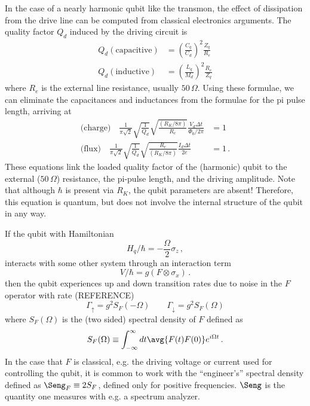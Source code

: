 In the case of a nearly harmonic qubit like the transmon, the effect of dissipation from the drive line can be computed from classical electronics arguments.
The quality factor $Q_d$ induced by the driving circuit is
\begin{align*}
  Q_d (\text{capacitive}) &= \left( \frac{C_q}{C_d} \right)^2 \frac{Z_q}{R_e} \\
  Q_d (\text{inductive}) &= \left( \frac{L_q}{M_d} \right)^2 \frac{R_e}{Z_q}
\end{align*}
where $R_e$ is the external line resistance, usually $50 \, \Omega$.
Using these formulae, we can eliminate the capacitances and inductances from the formulae for the pi pulse length, arriving at
\begin{align*}
  \text{(charge)} \quad
    \frac{1}{\pi\sqrt{2}} \sqrt{\frac{1}{Q_d}}
    \sqrt{\frac{(R_K/8\pi)}{R_e}} \frac{V_d \Delta t}{\Phi_0/2\pi} &= 1 \\
  \text{(flux)} \quad
    \frac{1}{\pi\sqrt{2}} \sqrt{\frac{1}{Q_d}}
    \sqrt{\frac{R_e}{(R_K/8\pi)}} \frac{I_d \Delta t}{2e} &= 1 \, .
\end{align*}
These equations link the loaded quality factor of the (harmonic) qubit to the external ($50 \, \Omega$) resistance, the pi-pulse length, and the driving amplitude.
Note that although $\hbar$ is present via $R_K$, the qubit parameters are absent!
Therefore, this equation is quantum, but does not involve the internal structure of the qubit in any way.


If the qubit with Hamiltonian
\begin{equation*}
  H_q / \hbar = - \frac{\Omega}{2} \sigma_z \, ,
\end{equation*}
interacts with some other system through an interaction term
\begin{equation*}
  V / \hbar = g(F \otimes \sigma_x) \, .
\end{equation*}
then the qubit experiences up and down transition rates due to noise in the $F$ operator with rate (REFERENCE)
\begin{equation*}
  \Gamma_\uparrow = g^2 S_F(- \Omega) \qquad \Gamma_\downarrow = g^2 S_F(\Omega)
\end{equation*}
where $S_F(\Omega)$ is the (two sided) spectral density of $F$ defined as
\begin{equation*}
  S_F(\Omega) \equiv \int_{-\infty}^\infty dt \avg{F(t) F(0)} e^{i \Omega t} \, .
\end{equation*}
In the case that $F$ is classical, e.g. the driving voltage or current used for controlling the qubit, it is common to work with the ``engineer's'' spectral density defined as $\Seng_F \equiv 2 S_F$, defined only for positive frequencies.
$\Seng$ is the quantity one measures with e.g. a spectrum analyzer.

